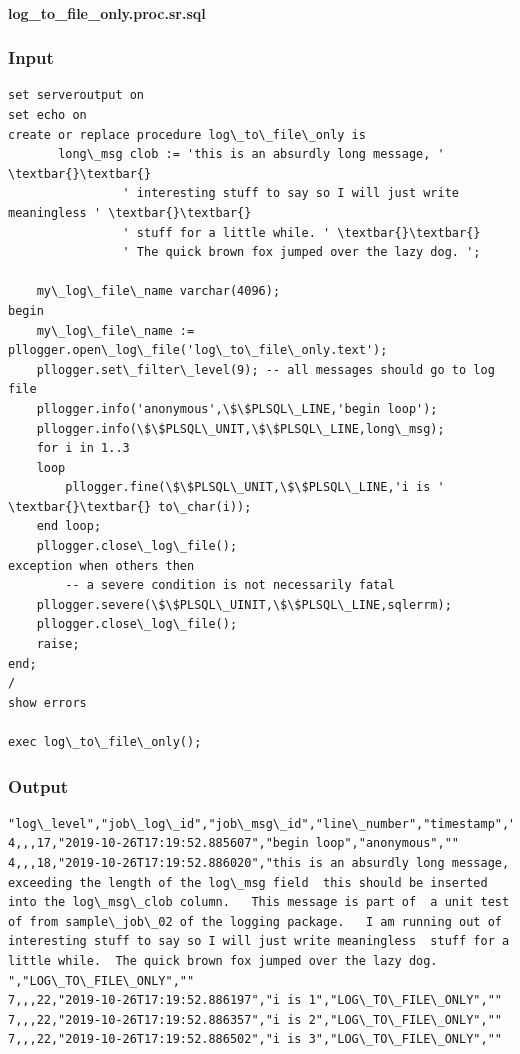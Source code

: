\documentclass[letterpaper,10pt,english]{sphinxmanual}
\begin{document}
\paragraph{log\_to\_file\_only.proc.sr.sql}
\label{flatFile:log-to-file-only-proc-sr-sql}

\subsubsection{Input}
\label{flatFile:input}
\begin{Verbatim}[commandchars=\\\{\}]
set serveroutput on
set echo on
create or replace procedure log\_to\_file\_only is
       long\_msg clob := 'this is an absurdly long message, ' \textbar{}\textbar{}
                ' interesting stuff to say so I will just write meaningless ' \textbar{}\textbar{}
                ' stuff for a little while. ' \textbar{}\textbar{}
                ' The quick brown fox jumped over the lazy dog. ';

    my\_log\_file\_name varchar(4096);
begin
    my\_log\_file\_name := pllogger.open\_log\_file('log\_to\_file\_only.text');
    pllogger.set\_filter\_level(9); -- all messages should go to log file
    pllogger.info('anonymous',\$\$PLSQL\_LINE,'begin loop');
    pllogger.info(\$\$PLSQL\_UNIT,\$\$PLSQL\_LINE,long\_msg);
    for i in 1..3
    loop
        pllogger.fine(\$\$PLSQL\_UNIT,\$\$PLSQL\_LINE,'i is ' \textbar{}\textbar{} to\_char(i));
    end loop;
    pllogger.close\_log\_file();
exception when others then
        -- a severe condition is not necessarily fatal
    pllogger.severe(\$\$PLSQL\_UINIT,\$\$PLSQL\_LINE,sqlerrm);
    pllogger.close\_log\_file();
    raise;
end;
/
show errors

exec log\_to\_file\_only();
\end{Verbatim}


\subsubsection{Output}
\label{flatFile:output}
\begin{Verbatim}[commandchars=\\\{\}]
"log\_level","job\_log\_id","job\_msg\_id","line\_number","timestamp","log\_msg","caller\_name","call\_stack"
4,,,17,"2019-10-26T17:19:52.885607","begin loop","anonymous",""
4,,,18,"2019-10-26T17:19:52.886020","this is an absurdly long message,  exceeding the length of the log\_msg field  this should be inserted into the log\_msg\_clob column.   This message is part of  a unit test of from sample\_job\_02 of the logging package.   I am running out of  interesting stuff to say so I will just write meaningless  stuff for a little while.  The quick brown fox jumped over the lazy dog. ","LOG\_TO\_FILE\_ONLY",""
7,,,22,"2019-10-26T17:19:52.886197","i is 1","LOG\_TO\_FILE\_ONLY",""
7,,,22,"2019-10-26T17:19:52.886357","i is 2","LOG\_TO\_FILE\_ONLY",""
7,,,22,"2019-10-26T17:19:52.886502","i is 3","LOG\_TO\_FILE\_ONLY",""
\end{Verbatim}
\end{document}
